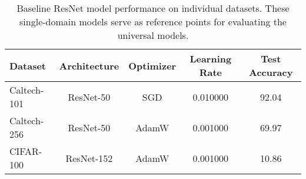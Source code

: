 \begin{table}[ht]
\centering
\caption{Baseline ResNet model performance on individual datasets. These single-domain models serve as reference points for evaluating the universal models.}
\label{tab:baseline_model_results}
\begin{tabular}{lcccc}
\toprule
Dataset & Architecture & Optimizer & Learning Rate & Test Accuracy \\
\midrule
Caltech-101 & ResNet-50 & SGD & 0.010000 & 92.04 \\
Caltech-256 & ResNet-50 & AdamW & 0.001000 & 69.97 \\
CIFAR-100 & ResNet-152 & AdamW & 0.001000 & 10.86 \\
\bottomrule
\end{tabular}
\end{table}
